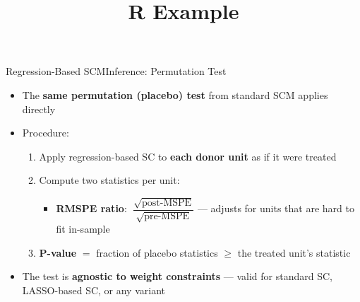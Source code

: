 \documentclass[hyperref={pdfpagelabels=false}]{beamer}
\begin{document}
\begin{frame}{Regression-Based SCM}{Inference: Permutation Test}
\begin{itemize}
	\item The \textbf{same permutation (placebo) test} from standard SCM applies directly
	\vspace{0.2cm}
	\item Procedure:
	\begin{enumerate}
		\item Apply regression-based SC to \textbf{each donor unit} as if it were treated
		\vspace{0.1cm}
		\item Compute two statistics per unit:
		\begin{itemize}
			\item \textbf{RMSPE ratio}: $\;\dfrac{\sqrt{\text{post-MSPE}}}{\sqrt{\text{pre-MSPE}}}$ --- adjusts for units that are hard to fit in-sample
		\end{itemize}
		\vspace{0.1cm}
		\item \textbf{P-value} $=$ fraction of placebo statistics $\geq$ the treated unit's statistic
	\end{enumerate}
	\vspace{0.2cm}
	\item The test is \textbf{agnostic to weight constraints} --- valid for standard SC, LASSO-based SC, or any variant
\end{itemize}
\end{frame}


\title[]{R Example}
\author{}\institute{}\date{}
\begin{frame}{}\titlepage\end{frame}
\end{document}
